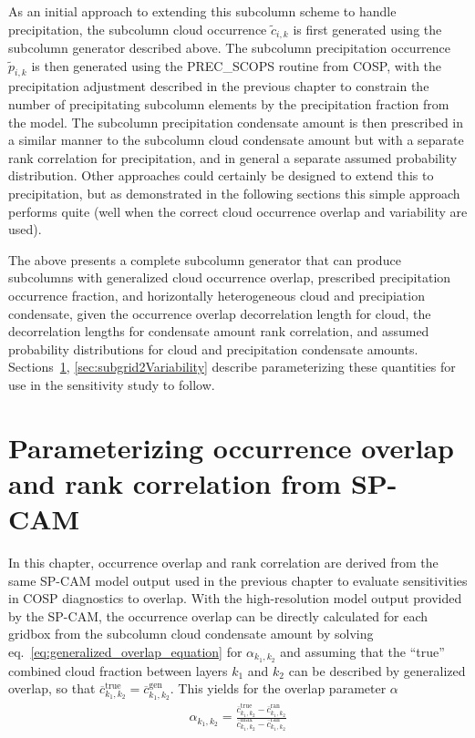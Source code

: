 As an initial approach to extending this subcolumn scheme to handle
precipitation, the subcolumn cloud occurrence \(\tilde{c}_{i, k}\) is
first generated using the subcolumn generator described above. The
subcolumn precipitation occurrence \(\tilde{p}_{i, k}\) is then
generated using the PREC\_SCOPS routine from COSP, with the
precipitation adjustment described in the previous chapter to constrain
the number of precipitating subcolumn elements by the precipitation
fraction from the model. The subcolumn precipitation condensate amount
is then prescribed in a similar manner to the subcolumn cloud condensate
amount but with a separate rank correlation for precipitation, and in
general a separate assumed probability distribution. Other approaches
could certainly be designed to extend this to precipitation, but as
demonstrated in the following sections this simple approach performs
quite (well when the correct cloud occurrence overlap and variability
are used).

The above presents a complete subcolumn generator that can produce
subcolumns with generalized cloud occurrence overlap, prescribed
precipitation occurrence fraction, and horizontally heterogeneous cloud
and precipiation condensate, given the occurrence overlap decorrelation
length for cloud, the decorrelation lengths for condensate amount rank
correlation, and assumed probability distributions for cloud and
precipitation condensate amounts.
Sections~\ref{sec:subgrid2Overlap}, \ref{sec:subgrid2Variability}
describe parameterizing these quantities for use in the sensitivity
study to follow.

\section{Parameterizing occurrence overlap and rank correlation from
SP-CAM}\label{sec:subgrid2Overlap}

In this chapter, occurrence overlap and rank correlation are derived
from the same SP-CAM model output used in the previous chapter to
evaluate sensitivities in COSP diagnostics to overlap. With the
high-resolution model output provided by the SP-CAM, the occurrence
overlap can be directly calculated for each gridbox from the subcolumn
cloud condensate amount by solving
eq.~\ref{eq:generalized_overlap_equation} for \(\alpha_{k_1, k_2}\) and
assuming that the ``true'' combined cloud fraction between layers
\(k_1\) and \(k_2\) can be described by generalized overlap, so that
\(\overline{c}^\textrm{true}_{k_1, k_2} = \overline{c}^\textrm{gen}_{k_1, k_2}\).
This yields for the overlap parameter \(\alpha\)
\begin{equation}\begin{gathered} 
    \alpha_{k_1, k_2} = \frac{
        \overline{c}^\textrm{true}_{k_1, k_2} 
            - \overline{c}^\textrm{ran}_{k_1, k_2} 
    }{
        \overline{c}^\textrm{max}_{k_1, k_2} 
            - \overline{c}^\textrm{ran}_{k_1, k_2} 
    }
\end{gathered}\label{eq:alphaEquation}\end{equation}

